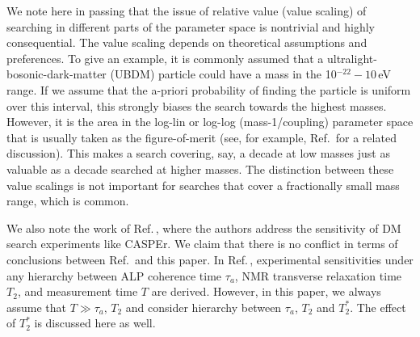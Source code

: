 We note here in passing that the issue of relative value (value scaling) of searching in different parts of the parameter space is nontrivial and highly consequential. The value scaling depends on theoretical assumptions and preferences. To give an example, it is commonly assumed that a ultralight-bosonic-dark-matter (UBDM) particle could have a mass in the 10$^{-22}-10$\,eV range. If we assume that the a-priori probability of finding the particle is uniform over this interval, this strongly biases the search towards the highest masses. However, it is the area in the log-lin or log-log
(mass-1/coupling) parameter space that is usually taken as the figure-of-merit (see, for example, Ref.\,\cite{Gedalia_Perez2010HierarchyPhysRevD} for a related discussion). This makes a search covering, say, a decade at low masses just as valuable as a decade searched at higher masses. The distinction between these value scalings is not important for searches that cover a fractionally small mass range, which is common.
 
 
 




We also note the work of Ref.\,\cite{Dror_2022_SensitivityofSpinPrecession_PhysRevLett.130.181801}, where the authors address the sensitivity of DM search experiments like CASPEr. We claim that there is no conflict in terms of conclusions between Ref.\,\cite{Dror_2022_SensitivityofSpinPrecession_PhysRevLett.130.181801} and this paper. 
In Ref.\,\cite{Dror_2022_SensitivityofSpinPrecession_PhysRevLett.130.181801}, experimental sensitivities under any hierarchy between ALP coherence time $\tau_a$, NMR transverse relaxation time $T_2$, and measurement time $T$ are derived. However, in this paper, we always assume that $T\gg\tau_a,\,T_2$ and consider hierarchy between $\tau_a$, $T_2$ and $T_2^*$. The effect of $T_2^*$ is discussed here as well. 



